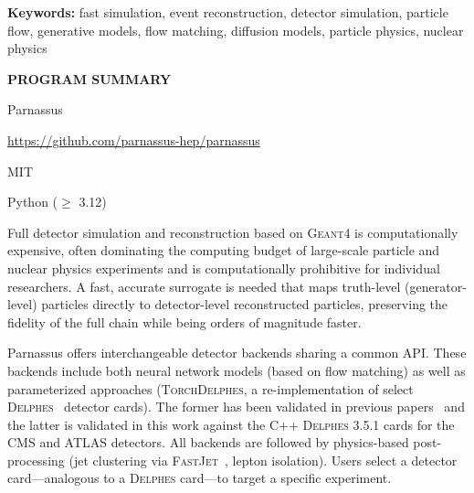 \documentclass[11pt,a4paper]{article}          %
\begin{document}
\noindent\textbf{Keywords:} fast simulation, event reconstruction, detector simulation,
  particle flow, generative models, flow matching, diffusion models,
  particle physics, nuclear physics

\bigskip
\begin{center}
\textbf{PROGRAM SUMMARY}
\end{center}

\noindent
\begin{small}
\begin{description}[style=nextline, leftmargin=4.5cm, labelwidth=4.3cm,
  labelsep=0.2cm, font=\normalfont\itshape, itemsep=2pt]

\item[Program title:] Parnassus

\item[Developer's repository link:]
  \url{https://github.com/parnassus-hep/parnassus}

\item[Licensing provisions:] MIT

\item[Programming language:] Python ($\geq$ 3.12)

\item[Nature of problem:]
  Full detector simulation and reconstruction based on \textsc{Geant4} is
  computationally expensive, often dominating the computing budget of
  large-scale particle and nuclear physics experiments and is computationally prohibitive for individual researchers. A fast, accurate surrogate is
  needed that maps truth-level (generator-level) particles directly to
  detector-level reconstructed particles, preserving the fidelity of the full
  chain while being orders of magnitude faster.

\item[Solution method:]
  Parnassus offers interchangeable detector backends sharing a common
  API. These backends include both neural network models (based on flow matching) as well as parameterized approaches (\textsc{TorchDelphes}, a re-implementation of select
  \textsc{Delphes}~\cite{delphes} detector cards).  The former has been validated in previous papers~\cite{parnassus_v2,parnassus_lep} and the latter is validated in this work against the C++
  \textsc{Delphes} 3.5.1 cards for the CMS and ATLAS detectors.  All backends are
  followed by physics-based post-processing (jet clustering via
  \textsc{FastJet}~\cite{fastjet}, lepton isolation). Users select a
  detector card---analogous to a \textsc{Delphes} card---to target a
  specific experiment.


\end{description}
\end{small}
\end{document}

